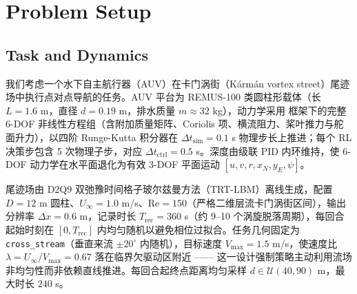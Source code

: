 %
%
%

\section{Problem Setup}\label{sec:setup}

\subsection{Task and Dynamics}\label{subsec:setup_task}

我们考虑一个水下自主航行器（AUV）在卡门涡街（Kármán vortex street）尾迹场中执行点对点导航的任务。AUV 平台为 REMUS-100 类圆柱形载体（长 $L = 1.6$ m，直径 $d = 0.19$ m，排水质量 $m \approx 32$ kg），动力学采用 \citet{fossen2011handbook} 框架下的完整 6-DOF 非线性方程组（含附加质量矩阵、Coriolis 项、横流阻力、桨叶推力与舵面升力），以四阶 Runge-Kutta 积分器在 $\Delta t_{\mathrm{sim}} = 0.1$ s 物理步长上推进；每个 RL 决策步包含 5 次物理子步，对应 $\Delta t_{\mathrm{ctrl}} = 0.5$ s。深度由级联 PID 内环维持，使 6-DOF 动力学在水平面退化为有效 3-DOF 平面运动 $[u, v, r, x_N, y_E, \psi]$。

尾迹场由 D2Q9 双弛豫时间格子玻尔兹曼方法（TRT-LBM）离线生成，配置 $D = 12$ m 圆柱、$U_\infty = 1.0$ m/s、$\mathrm{Re} = 150$（严格二维层流卡门涡街区间），输出分辨率 $\Delta x = 0.6$ m，记录时长 $T_{\mathrm{rec}} = 360$ s（约 9--10 个涡旋脱落周期），每回合起始时刻在 $[0, T_{\mathrm{rec}}]$ 内均匀随机以避免相位过拟合。任务几何固定为 \texttt{cross\_stream}（垂直来流 $\pm 20^\circ$ 内随机），目标速度 $V_{\max} = 1.5$ m/s，使速度比 $\lambda = U_\infty / V_{\max} = 0.67$ 落在临界欠驱动区附近 —— 这一设计强制策略主动利用流场非均匀性而非依赖直线推进。每回合起终点距离均匀采样 $d \in \mathcal{U}(40, 90)$ m，最大时长 $240$ s。

